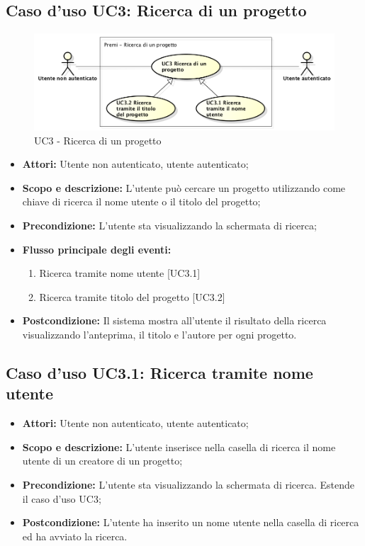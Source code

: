 \subsection{Caso d'uso UC3: Ricerca di un progetto}
\begin{figure}[h] 
	\centering 
	\includegraphics[scale=0.45] {img/UC3.png}
	\caption{UC3 - Ricerca di un progetto} 
\end{figure}

\begin{itemize}
	\item \textbf{Attori:} Utente non autenticato, utente autenticato;
	\item \textbf{Scopo e descrizione:} L'utente può cercare un progetto utilizzando come chiave di ricerca il nome utente o il titolo del progetto;
	\item \textbf{Precondizione:} L'utente sta visualizzando la schermata di ricerca;
	\item \textbf{Flusso principale degli eventi:}
	\begin{enumerate}
		\item Ricerca tramite nome utente [UC3.1]
		\item Ricerca tramite titolo del progetto [UC3.2]
	\end{enumerate}
	\item \textbf{Postcondizione:} Il sistema mostra all'utente il risultato della ricerca visualizzando l'anteprima, il titolo e l'autore per ogni progetto.
\end{itemize}

\subsection{Caso d'uso UC3.1: Ricerca tramite nome utente}
\begin{itemize}
	\item \textbf{Attori:} Utente non autenticato, utente autenticato;
	\item \textbf{Scopo e descrizione:} L'utente inserisce nella casella di ricerca il nome utente di un creatore di un progetto;
	\item \textbf{Precondizione:} L'utente sta visualizzando la schermata di ricerca. Estende il caso d'uso UC3;
	\item \textbf{Postcondizione:} L'utente ha inserito un nome utente nella casella di ricerca ed ha avviato la ricerca.
\end{itemize}

